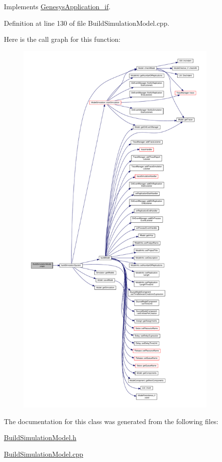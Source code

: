 Implements \hyperlink{class_genesys_application__if_a2b07e7803b410a4a8d0f87422dabb004}{Genesys\-Application\-\_\-if}.



Definition at line 130 of file Build\-Simulation\-Model.\-cpp.



Here is the call graph for this function\-:
\nopagebreak
\begin{figure}[H]
\begin{center}
\leavevmode
\includegraphics[height=550pt]{class_build_simulation_model_a8c50f55d7293860e5e7bc7e7e74f8d4a_cgraph}
\end{center}
\end{figure}




The documentation for this class was generated from the following files\-:\begin{DoxyCompactItemize}
\item 
\hyperlink{_build_simulation_model_8h}{Build\-Simulation\-Model.\-h}\item 
\hyperlink{_build_simulation_model_8cpp}{Build\-Simulation\-Model.\-cpp}\end{DoxyCompactItemize}
